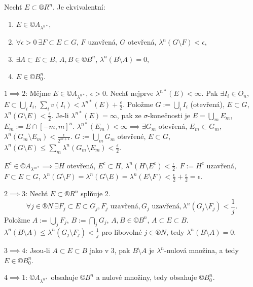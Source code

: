 \documentclass[12pt]{article}					%
\begin{document}
\begin{veta}
	Nechť $E \subset ®R^n$. Je ekvivalentní:
	
	\begin{enumerate}
		\item $E \in ©A_{\lambda^{n*}}$,
		\item $\forall \epsilon > 0 \ \exists F \subset E \subset G$, $F$ uzavřená, $G$ otevřená, $\lambda^n(G \setminus F) < \epsilon$,
		\item $\exists A \subset E \subset B$, $A, B \in ©B^n$, $\lambda^n(B \setminus A) = 0$,
		\item $E \in ©B_0^n$.
	\end{enumerate}

	\begin{dukazin}
		$1 \implies 2$: Mějme $E \in ©A_{\lambda^{n*}}$, $\epsilon > 0$. Nechť nejprve $\lambda^{n*}(E) < ∞$. Pak $\exists I_i \in O_n$, $E \subset \bigcup_i I_i$, $\sum_i v(I_i) < \lambda^{n*}(E) + \frac{\epsilon}{2}$. Položme $G := \bigcup_i I_i$ (otevřená), $E \subset G$, $\lambda^n(G \setminus E) < \frac{\epsilon}{2}$. Je-li $\lambda^{n*}(E) = ∞$, pak ze $\sigma$-konečnosti je $E = \bigcup_m E_m$, $E_m := E \cap [-m, m]^n$. $\lambda^{n*}(E_m) < ∞ \implies \exists G_m$ otevřená, $E_m \subset G_m$, $\lambda^n(G_m \setminus E_m) < \frac{\epsilon}{2^{m+1}}$. $G := \bigcup_m G_m$ otevřené, $E \subset G$, $\lambda^n(G \setminus E) ≤ \sum_m \lambda^n(G_m \setminus E_m) < \frac{\epsilon}{2}$.

		$E^c \in ©A_{\lambda^{m*}} \implies \exists H$ otevřená, $E^c \subset H$, $\lambda^n(H \setminus E^c) < \frac{\epsilon}{2}$. $F:= H^c$ uzavřená, $F \subset E \subset G$, $\lambda^n(G \setminus F) = \lambda^n(G \setminus E) = \lambda^n(E \setminus F) < \frac{\epsilon}{2} + \frac{\epsilon}{2} = \epsilon$.

		$2 \implies 3$: Nechť $E \subset ®R^n$ splňuje 2.
		$$ \forall j \in ®N \ \exists F_j \subset E \subset G_j, F_j \text{ uzavřená}, G_j \text{ uzavřená}, \lambda^n(G_j \setminus F_j) < \frac{1}{j}. $$
		Položme $A := \bigcup_j F_j$, $B := \bigcap_j G_j$, $A, B \in ©B^n$, $A \subset E \subset B$. $\lambda^n(B \setminus A)  ≤ \lambda^n(G_j \setminus F_j) < \frac{1}{j}$ pro libovolné $j \in ®N$, tedy $\lambda^n(B \setminus A) = 0$.

		$3 \implies 4$: Jsou-li $A \subset E \subset B$ jako v 3, pak $B \setminus A$ je $\lambda^n$-nulová množina, a tedy $E \in ©B_0^n$.

		$4 \implies 1$: $©A_{\lambda^{n*}}$ obsahuje $©B^n$ a nulové množiny, tedy obsahuje $©B_0^n$.
	\end{dukazin}
\end{veta}
\end{document}

